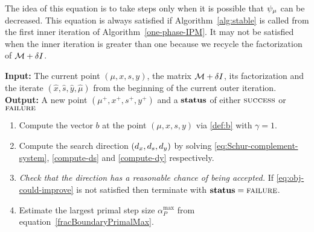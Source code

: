 \documentclass{article}
\begin{document}
The idea of this equation is to take steps only when it is possible that $\psi_{\mu}$ can be decreased. This equation is always satisfied if Algorithm~\ref{alg:stable} is called from the first inner iteration of Algorithm~\ref{one-phase-IPM}. It may not be satisfied when the inner iteration is greater than one because we recycle the factorization of $\mathcal{M} + \delta I$.


\begin{algorithm}[H]
\textbf{Input:} The current point $(\mu, x, s, y)$, the matrix $\mathcal{M} + \delta I$, its factorization and the iterate $(\hat{x}, \hat{s},  \hat{y}, \hat{\mu})$ from the beginning of the current outer iteration.  \\
\textbf{Output:} A new point $(\mu^{+}, x^{+}, s^{+}, y^{+})$ and a $\textbf{status}$ of either $\textsc{success}$ or $\textsc{failure}$
\begin{enumerate}[label*=A.{\arabic*}]
\item Compute the vector $b$ at the point $(\mu, x, s, y)$ via \eqref{def:b} with $\gamma = 1$.
\item Compute the search direction $(d_{x}, d_{s}, d_{y})$ by solving \eqref{eq:Schur-complement-system}, \eqref{compute-ds} and \eqref{compute-dy} respectively.
\item \emph{Check that the direction has a reasonable chance of being accepted.} If \eqref{eq:obj-could-improve} is not satisfied then terminate with $\textbf{status} = \textsc{failure}$.
\item Estimate the largest primal step size $\alpha^{\max}_{P}$ from equation~\eqref{fracBoundaryPrimalMax}.

\end{enumerate}
\end{algorithm}
\end{document}
